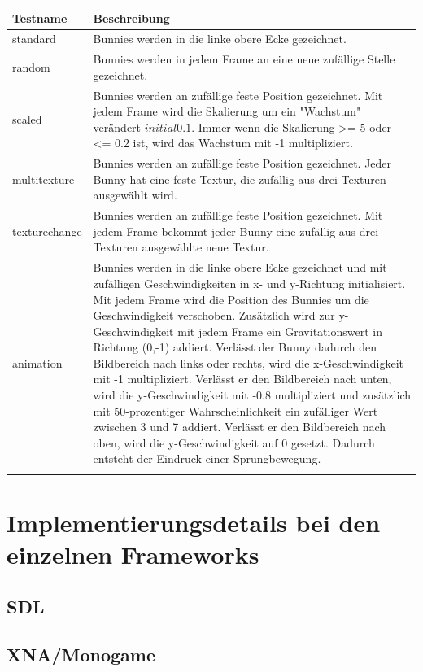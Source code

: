 \begin{center}
    \begin{tabular}{ | l | p{12cm} |}
    \hline
    Testname & Beschreibung \\ \hline
    standard & Bunnies werden in die linke obere Ecke gezeichnet.\\ \hline
    random & Bunnies werden in jedem Frame an eine neue zufällige Stelle gezeichnet.\\ \hline
    scaled & Bunnies werden an zufällige feste Position gezeichnet. Mit jedem Frame wird die Skalierung um ein "Wachstum" verändert \(initial 0.1\). Immer wenn die Skalierung >= 5 oder <= 0.2 ist, wird das Wachstum mit -1 multipliziert. \\ \hline
    multitexture & Bunnies werden an zufällige feste Position gezeichnet. Jeder Bunny hat eine feste Textur, die zufällig aus drei Texturen ausgewählt wird.\\ \hline
    texturechange & Bunnies werden an zufällige feste Position gezeichnet. Mit jedem Frame bekommt jeder Bunny eine zufällig aus drei Texturen ausgewählte neue Textur. \\ \hline
    animation & Bunnies werden in die linke obere Ecke gezeichnet und mit zufälligen Geschwindigkeiten in x- und y-Richtung initialisiert. Mit jedem Frame wird die Position des Bunnies um die Geschwindigkeit verschoben. Zusätzlich wird zur y-Geschwindigkeit mit jedem Frame ein Gravitationswert in Richtung (0,-1) addiert. Verlässt der Bunny dadurch den Bildbereich nach links oder rechts, wird die x-Geschwindigkeit mit -1 multipliziert. Verlässt er den Bildbereich nach unten, wird die y-Geschwindigkeit mit -0.8 multipliziert und zusätzlich mit 50-prozentiger Wahrscheinlichkeit ein zufälliger Wert zwischen 3 und 7 addiert. Verlässt er den Bildbereich nach oben, wird die y-Geschwindigkeit auf 0 gesetzt. Dadurch entsteht der Eindruck einer Sprungbewegung.\\ \hline
    \\ \hline
    \end{tabular}
\end{center}

\section{Implementierungsdetails bei den einzelnen Frameworks}
\subsection{SDL}
\subsection{XNA/Monogame}
